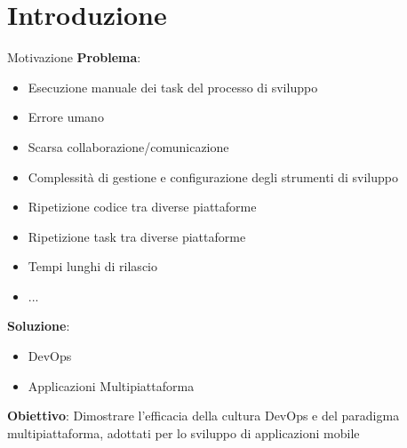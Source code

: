 
\section{Introduzione}

\begin{frame}{Motivazione}
    \textbf{Problema}:
    \begin{itemize}
        \item Esecuzione manuale dei task del processo di sviluppo
        \item Errore umano
        \item Scarsa collaborazione/comunicazione
        \item Complessità di gestione e configurazione degli strumenti di sviluppo
        \item Ripetizione codice tra diverse piattaforme
        \item Ripetizione task tra diverse piattaforme
        \item Tempi lunghi di rilascio
        \item ...
    \end{itemize}
    
    \vspace{5mm}
    
    \textbf{Soluzione}:
    \begin{itemize}
        \item DevOps
        \item Applicazioni Multipiattaforma
    \end{itemize}
        
    \vspace{5mm}
    
    \textbf{Obiettivo}: Dimostrare l'efficacia della cultura DevOps e del paradigma multipiattaforma, adottati per lo sviluppo di applicazioni mobile
\end{frame}

